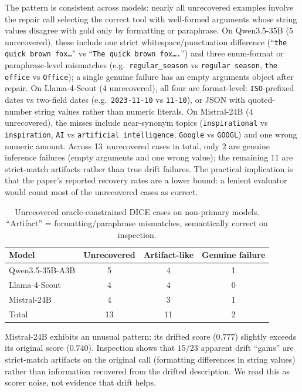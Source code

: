\documentclass[runningheads]{llncs}
\begin{document}
The pattern is consistent across models: nearly all unrecovered examples
involve the repair call selecting the correct tool with well-formed arguments
whose string values disagree with gold only by formatting or paraphrase. On
Qwen3.5-35B ($5$ unrecovered), these include one strict whitespace/punctuation
difference (``\texttt{the quick brown fox\ldots}'' vs
``\texttt{The quick brown fox\ldots.}'') and three enum-format or
paraphrase-level mismatches (e.g.\ \texttt{regular\_season} vs
\texttt{regular season}, \texttt{the office} vs \texttt{Office}); a single
genuine failure has an empty arguments object after repair. On Llama-4-Scout
($4$ unrecovered), all four are format-level: \texttt{ISO}-prefixed dates
vs two-field dates (e.g.\ \texttt{2023-11-10} vs \texttt{11-10}), or JSON
with quoted-number string values rather than numeric literals. On Mistral-24B
($4$ unrecovered), the misses include near-synonym topics (\texttt{inspirational}
vs \texttt{inspiration}, \texttt{AI} vs \texttt{artificial intelligence},
\texttt{Google} vs \texttt{GOOGL}) and one wrong numeric amount. Across
13~unrecovered cases in total, only $2$ are genuine inference failures
(empty arguments and one wrong value); the remaining $11$ are strict-match
artifacts rather than true drift failures. The practical implication is that
the paper's reported recovery rates are a lower bound: a lenient evaluator
would count most of the unrecovered cases as correct.

\begin{table}[t]
\caption{Unrecovered oracle-constrained DICE cases on non-primary models.
``Artifact'' = formatting/paraphrase mismatches, semantically correct on inspection.}
\label{tab:unrecovered-summary}
\centering
\small
\begin{tabular}{lccc}
\toprule
Model & Unrecovered & Artifact-like & Genuine failure \\
\midrule
Qwen3.5-35B-A3B & 5 & 4 & 1 \\
Llama-4-Scout   & 4 & 4 & 0 \\
Mistral-24B     & 4 & 3 & 1 \\
\midrule
Total           & 13 & 11 & 2 \\
\bottomrule
\end{tabular}
\end{table}

Mistral-24B exhibits an unusual pattern: its drifted score ($0.777$) slightly
exceeds its original score ($0.740$). Inspection shows that $15/23$ apparent
drift ``gains'' are strict-match artifacts on the original call (formatting
differences in string values) rather than information recovered from the drifted
description. We read this as scorer noise, not evidence that drift helps.
\end{document}
